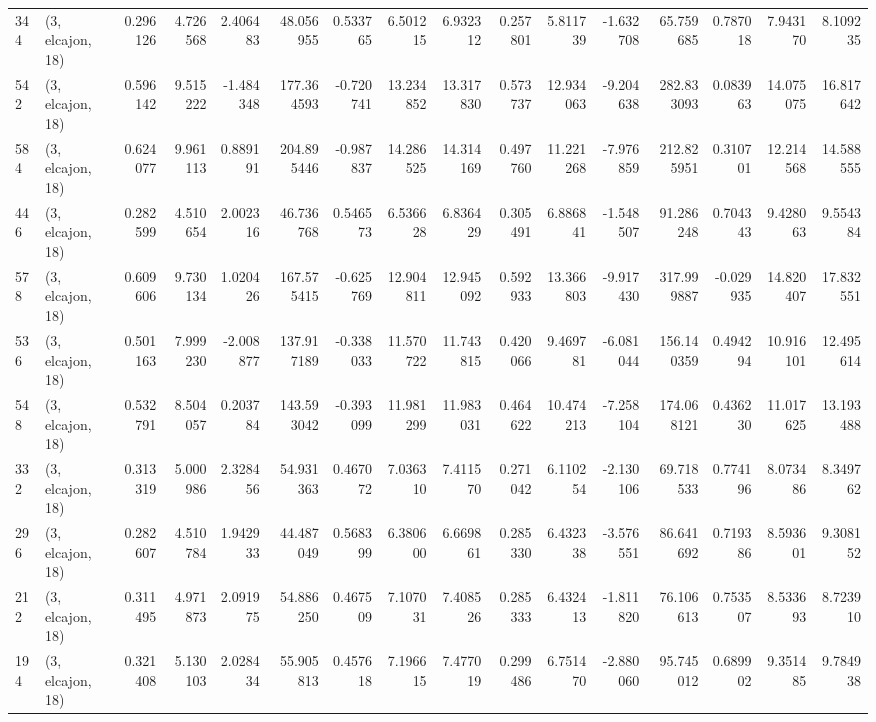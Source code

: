 \begin{tabular}{llrrrrrrrrrrrrrr}
344 &  (3, elcajon, 18) &   0.296126 &   4.726568 &   2.406483 &    48.056955 &   0.533765 &   6.501215 &   6.932312 &  0.257801 &   5.811739 &  -1.632708 &     65.759685 &   0.787018 &   7.943170 &    8.109235 \\
542 &  (3, elcajon, 18) &   0.596142 &   9.515222 &  -1.484348 &   177.364593 &  -0.720741 &  13.234852 &  13.317830 &  0.573737 &  12.934063 &  -9.204638 &    282.833093 &   0.083963 &  14.075075 &   16.817642 \\
584 &  (3, elcajon, 18) &   0.624077 &   9.961113 &   0.889191 &   204.895446 &  -0.987837 &  14.286525 &  14.314169 &  0.497760 &  11.221268 &  -7.976859 &    212.825951 &   0.310701 &  12.214568 &   14.588555 \\
446 &  (3, elcajon, 18) &   0.282599 &   4.510654 &   2.002316 &    46.736768 &   0.546573 &   6.536628 &   6.836429 &  0.305491 &   6.886841 &  -1.548507 &     91.286248 &   0.704343 &   9.428063 &    9.554384 \\
578 &  (3, elcajon, 18) &   0.609606 &   9.730134 &   1.020426 &   167.575415 &  -0.625769 &  12.904811 &  12.945092 &  0.592933 &  13.366803 &  -9.917430 &    317.999887 &  -0.029935 &  14.820407 &   17.832551 \\
536 &  (3, elcajon, 18) &   0.501163 &   7.999230 &  -2.008877 &   137.917189 &  -0.338033 &  11.570722 &  11.743815 &  0.420066 &   9.469781 &  -6.081044 &    156.140359 &   0.494294 &  10.916101 &   12.495614 \\
548 &  (3, elcajon, 18) &   0.532791 &   8.504057 &   0.203784 &   143.593042 &  -0.393099 &  11.981299 &  11.983031 &  0.464622 &  10.474213 &  -7.258104 &    174.068121 &   0.436230 &  11.017625 &   13.193488 \\
332 &  (3, elcajon, 18) &   0.313319 &   5.000986 &   2.328456 &    54.931363 &   0.467072 &   7.036310 &   7.411570 &  0.271042 &   6.110254 &  -2.130106 &     69.718533 &   0.774196 &   8.073486 &    8.349762 \\
296 &  (3, elcajon, 18) &   0.282607 &   4.510784 &   1.942933 &    44.487049 &   0.568399 &   6.380600 &   6.669861 &  0.285330 &   6.432338 &  -3.576551 &     86.641692 &   0.719386 &   8.593601 &    9.308152 \\
212 &  (3, elcajon, 18) &   0.311495 &   4.971873 &   2.091975 &    54.886250 &   0.467509 &   7.107031 &   7.408526 &  0.285333 &   6.432413 &  -1.811820 &     76.106613 &   0.753507 &   8.533693 &    8.723910 \\
194 &  (3, elcajon, 18) &   0.321408 &   5.130103 &   2.028434 &    55.905813 &   0.457618 &   7.196615 &   7.477019 &  0.299486 &   6.751470 &  -2.880060 &     95.745012 &   0.689902 &   9.351485 &    9.784938 \\

\end{tabular}
